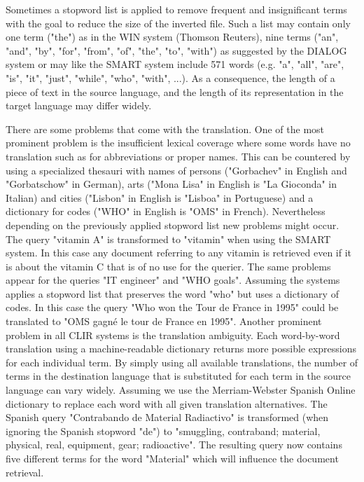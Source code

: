 \documentclass[journal]{IEEEtran}
\begin{document}
Sometimes a stopword list is applied to remove frequent and insignificant terms with the goal to reduce the size of the inverted file.
Such a list may contain only one term ("the") as in the WIN system (Thomson Reuters), nine terms ("an", "and", "by", "for", "from", "of", "the", "to", "with") as suggested by the DIALOG system or may like the SMART system include 571 words (e.g. "a", "all", "are", "is", "it", "just", "while", "who", "with", ...).
As a consequence, the length of a piece of text in the source language, and the length of its representation in the target language may differ widely.

There are some problems that come with the translation.
One of the most prominent problem is the insufficient lexical coverage where some words have no translation such as for abbreviations or proper names.
This can be countered by using a specialized thesauri with names of persons ("Gorbachev" in English and "Gorbatschow" in German), arts ("Mona Lisa" in English is "La Gioconda" in Italian) and cities ("Lisbon" in English is "Lisboa" in Portuguese) and a dictionary for codes ("WHO" in English is "OMS" in French).
Nevertheless depending on the previously applied stopword list new problems might occur.
The query "vitamin A" is transformed to "vitamin" when using the SMART system.
In this case any document referring to any vitamin is retrieved even if it is about the vitamin C that is of no use for the querier.
The same problems appear for the queries "IT engineer" and "WHO goals".
Assuming the systems applies a stopword list that preserves the word "who" but uses a dictionary of codes.
In this case the query "Who won the Tour de France in 1995" could be translated to "OMS gagn\'{e} le tour de France en 1995".
Another prominent problem in all CLIR systems is the translation ambiguity.
Each word-by-word translation using a machine-readable dictionary returns more possible expressions for each individual term.
By simply using all available translations, the number of terms in the destination language that is substituted for each term in the source language can vary widely.
Assuming we use the Merriam-Webster Spanish Online dictionary to replace each word with all given translation alternatives.
The Spanish query "Contrabando de Material Radiactivo" is transformed (when ignoring the Spanish stopword "de") to "smuggling, contraband; material, physical, real, equipment, gear; radioactive".
The resulting query now contains five different terms for the word "Material" which will influence the document retrieval.
\end{document}
